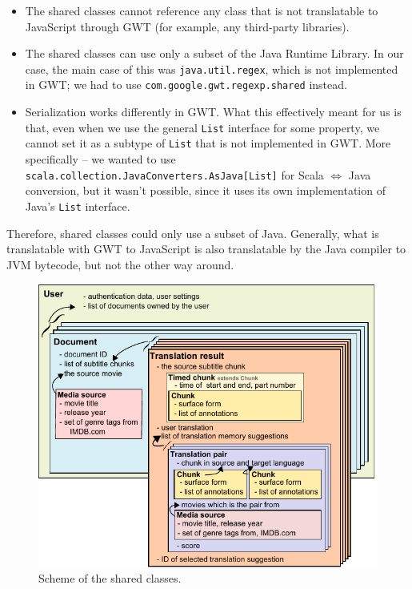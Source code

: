 \begin{itemize}
\item The shared classes cannot reference any class that is not translatable to JavaScript through GWT (for example, any third-party libraries).
\item The shared classes can use only a subset of the Java Runtime Library. In our case, the main case of this was \texttt{java.util.regex}, which is not implemented in GWT; we had to use \texttt{com.google.gwt.regexp.shared} instead.
\item Serialization works differently in GWT. What this effectively meant for us is that, even when we use the general \texttt{List} interface for some property, we cannot set it as a subtype of \texttt{List} that is not implemented in GWT. More specifically -- we wanted to use \texttt{scala.collection.JavaConverters.AsJava[List]} for Scala $\Leftrightarrow$ Java conversion, but it wasn't possible, since it uses its own implementation of Java's \texttt{List} interface.
\end{itemize}

Therefore, shared classes could only use a subset of Java. Generally, what is translatable with GWT to JavaScript is also translatable by the Java compiler to JVM bytecode, but not the other way around.


\begin{figure}[h]
\begin{center}
\includegraphics{figures/shared_classes.pdf}
\end{center}
\caption{Scheme of the shared classes.}\label{projectStructure:logical}
\end{figure}

